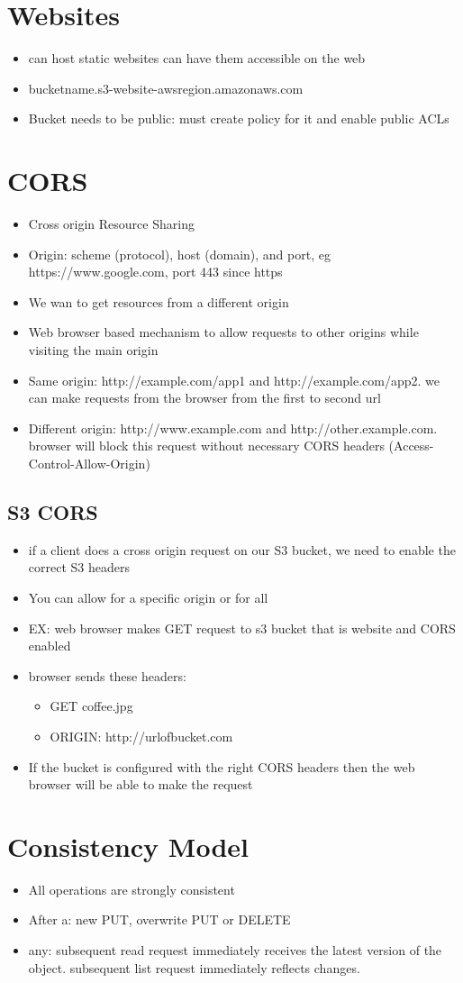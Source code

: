 \documentclass[]{scrartcl}
\begin{document}
\section{Websites}
\begin{itemize}
	\item can host static websites can have them accessible on the web
	\item bucketname.s3-website-awsregion.amazonaws.com
	\item Bucket needs to be public: must create policy for it and enable public ACLs
\end{itemize}

\section{CORS}
\begin{itemize}
	\item Cross origin Resource Sharing
	\item Origin: scheme (protocol), host (domain), and port, eg https://www.google.com, port 443 since https
	\item We wan to get resources from a different origin
	\item Web browser based mechanism to allow requests to other origins while visiting the main origin
	\item Same origin: http://example.com/app1 and http://example.com/app2. we can make requests from the browser from the first to second url
	\item Different origin: http://www.example.com and http://other.example.com. browser will block this request without necessary CORS headers (Access-Control-Allow-Origin)
\end{itemize}

\subsection{S3 CORS}
\begin{itemize}
	\item if a client does a cross origin request on our S3 bucket, we need to enable the correct S3 headers
	\item You can allow for a specific origin or for all
	\item EX: web browser makes GET request to s3 bucket that is website and CORS enabled
	\item browser sends these headers:
	\begin{itemize}
		\item GET coffee.jpg
		\item ORIGIN: http://urlofbucket.com
	\end{itemize}
	\item If the bucket is configured with the right CORS headers then the web browser will be able to make the request
\end{itemize}

\section{Consistency Model}
\begin{itemize}
	\item All operations are strongly consistent
	\item After a: new PUT, overwrite PUT or DELETE
	\item any: subsequent read request immediately receives the latest version of the object. subsequent list request immediately reflects changes. 
\end{itemize}
\end{document}
